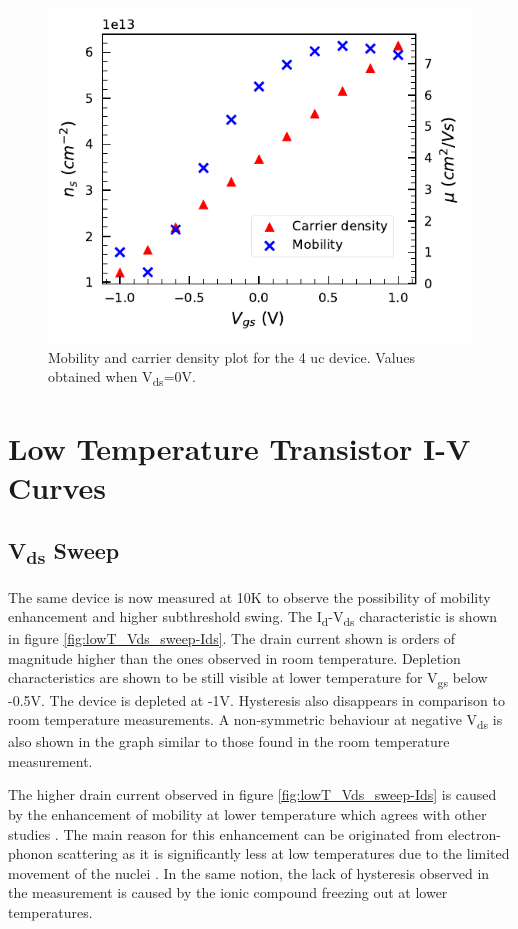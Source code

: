 \documentclass[11pt,a4paper]{report}
\begin{document}
\begin{figure}
    \centering
    \includegraphics{Figures/CV/Mobility_and_Carrier_density.pdf}
    \caption{Mobility and carrier density plot for the 4 uc device. Values obtained when V\textsubscript{ds}=0V.}
    \label{fig:mobility_carrier}
\end{figure}


\newpage
\section{Low Temperature Transistor I-V Curves}
\subsection{V\textsubscript{ds} Sweep}
The same device is now measured at 10K to observe the possibility of mobility enhancement and higher subthreshold swing. The I\textsubscript{d}-V\textsubscript{ds} characteristic is shown in figure \ref{fig:lowT_Vds_sweep-Ids}. The drain current shown is orders of magnitude higher than the ones observed in room temperature. Depletion characteristics are shown to be still visible at lower temperature for V\textsubscript{gs} below -0.5V. The device is depleted at -1V. Hysteresis also disappears in comparison to room temperature measurements. A non-symmetric behaviour at negative V\textsubscript{ds} is also shown in the graph similar to those found in the room temperature measurement. 

The higher drain current observed in figure \ref{fig:lowT_Vds_sweep-Ids} is caused by the enhancement of mobility at lower temperature which agrees with other studies \cite{caviglia,bogorin_irvin_cen_levy_2012}. The main reason for this enhancement can be originated from electron-phonon scattering as it is significantly less at low temperatures due to the limited movement of the nuclei \cite{hook_hall_2013}. In the same notion, the lack of hysteresis observed in the measurement is caused by the ionic compound freezing out at lower temperatures.
\end{document}
